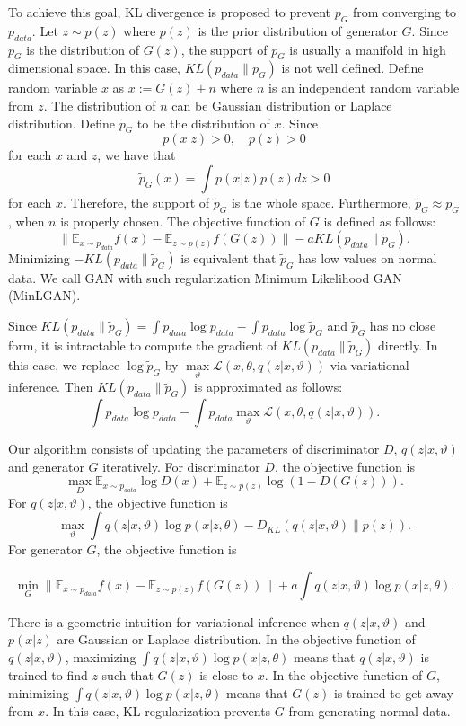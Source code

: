 \documentclass[a4paper,conference]{IEEEtran}
\begin{document}
To achieve this goal,  KL divergence is proposed to prevent $p_G$ from converging to $p_{data}$. Let $z\sim p(z)$ where $p(z)$ is the prior distribution of generator $G$. Since $p_G$ is the distribution of  $G(z)$, the support of $p_G$ is usually a manifold in high dimensional space. In this case, $KL(p_{data}\|p_G)$ is not well defined. Define random variable $x$  as  $x:= G(z) + n$ where $n$ is an independent random variable from $z$. The distribution of $n$ can be Gaussian distribution or Laplace distribution. Define $\tilde{p}_G$ to be the distribution of $x$. Since \[p(x|z)>0, \quad p(z)>0\]  for each $x$ and $z$, we have that \[\tilde{p}_G(x) = \int p(x|z)p(z)dz>0\] for each $x$. Therefore, the support of  $\tilde{p}_G$   is the whole space. Furthermore, $\tilde{p}_G\approx p_G$, when $n$ is properly chosen.  The objective function of  $G$ is defined as follows:
\begin{equation*}
\| \mathbb{E}_{x\sim p_{data}}f(x) - \mathbb{E}_{z\sim p(z)}f(G(z))\|- aKL(p_{data}\|\tilde{p}_G).
\end{equation*}
Minimizing $-KL(p_{data}\|\tilde{p}_G)$ is equivalent that $\tilde{p}_G$ has low values on normal data. We call GAN with such regularization  Minimum Likelihood GAN (MinLGAN).

Since $KL(p_{data}\|\tilde{p}_G) = \int p_{data} \log p_{data}-\int p_{data}\log \tilde{p}_G$
and $\tilde{p}_G$ has no close form, it is intractable  to compute the gradient of  $KL(p_{data}\|\tilde{p}_G)$ directly. In this case, we replace $\log\tilde{p}_G$ by $\max\limits_{\vartheta}\mathcal{L}(x, \theta, q(z|x, \vartheta))$ via variational inference.
Then $KL(p_{data}\|\tilde{p}_G)$ is approximated as follows:
\[\int p_{data} \log p_{data}-\int p_{data}\max\limits_{\vartheta}\mathcal{L}(x, \theta, q(z|x, \vartheta)).\]


Our algorithm consists of updating the parameters of  discriminator $D$, $q(z|x, \vartheta)$ and generator $G$ iteratively. For discriminator $D$, the objective function is
\[\max\limits_{D}\mathbb{E}_{x\sim p_{data}}\log D(x) + \mathbb{E}_{z\sim p(z)}\log (1-D(G(z))).\]
For $q(z|x, \vartheta)$, the objective function is
\[\max\limits_{\vartheta} \int q(z|x, \vartheta)\log p(x|z, \theta) - D_{KL}(q(z|x, \vartheta)\| p(z)).\]
For generator $G$, the objective function is
\begin{footnotesize}
\[\min\limits_{G}\| \mathbb{E}_{x\sim p_{data}}f(x) - \mathbb{E}_{z\sim p(z)}f(G(z))\| + a\int q(z|x, \vartheta)\log p(x|z, \theta).\]
\end{footnotesize}
There is a
geometric intuition  for variational inference when $q(z|x, \vartheta)$ and $p(x|z)$ are Gaussian or Laplace distribution. In the objective function of $q(z|x, \vartheta)$, maximizing  $\int q(z|x, \vartheta)\log p(x|z, \theta)$ means that $q(z|x, \vartheta)$ is trained to find $z$ such that $G(z)$ is close to $x$. In the objective function of $G$, minimizing $\int q(z|x, \vartheta)\log p(x|z, \theta)$  means that  $G(z)$ is trained to get away from $x$. In this case, KL regularization prevents  $G$ from generating normal data.
\end{document}
